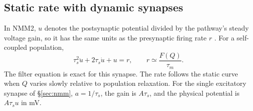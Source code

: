 \subsection{Static rate with dynamic synapses}
In NMM2, $u$ denotes the postsynaptic potential divided by the pathway's
steady voltage gain, so it has the same units as the presynaptic firing
rate $r$ \cite{clusella2023}. For a self-coupled population,
\begin{equation}
\tau_s^2\ddot u+2\tau_s\dot u+u=r,\qquad
r\simeq \frac{F(Q)}{\tau_m}.
\label{eq:slow_synapse}
\end{equation}
The filter equation is exact for this synapse. The rate follows the static
curve when $Q$ varies slowly relative to population relaxation. For the single excitatory synapse
of \S\ref{sec:nmm}, $a=1/\tau_s$, the gain is $A\tau_s$, and the physical potential is
$A\tau_s u$ in mV.
